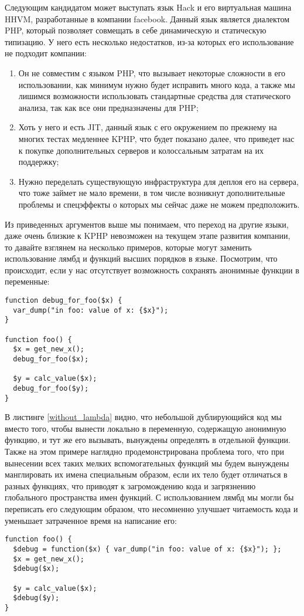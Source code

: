 Следующим кандидатом может выступать язык Hack и его виртуальная машина HHVM, разработанные в компании facebook.
Данный язык является диалектом PHP, который позволяет совмещать в себе динамическую и статическую типизацию.
У него есть несколько недостатков, из-за которых его использование не подходит компании:

\begin{enumerate}
\item Он не совместим с языком PHP, что вызывает некоторые сложности в его использовании, как минимум нужно будет исправить много кода, а также мы лишимся возможности использовать стандартные средства для статического анализа, так как все они предназначены для PHP;

\item Хоть у него и есть JIT, данный язык с его окружением по прежнему на многих тестах медленнее KPHP, что будет показано далее, что приведет нас к покупке дополнительных серверов и колоссальным затратам на их поддержку;

\item Нужно переделать существующую инфраструктура для деплоя его на сервера, что тоже займет не мало времени, в том числе возникнут дополнительные проблемы и спецэффекты о которых мы сейчас даже не можем предположить.
\end{enumerate}

Из приведенных аргументов выше мы понимаем, что переход на другие языки, даже очень близкие к KPHP невозможен на текущем этапе развития компании, то давайте взглянем на несколько примеров, которые могут заменить использование лямбд и функций высших порядков в языке.
Посмотрим, что происходит, если у нас отсутствует возможность сохранять анонимные функции в переменные:
\begin{lstlisting}[caption={Пример кода без анонимных функций},label={without_lambda}]
function debug_for_foo($x) {
  var_dump("in foo: value of x: {$x}");
}

function foo() {
  $x = get_new_x();
  debug_for_foo($x);

  $y = calc_value($x);
  debug_for_foo($y);
}
\end{lstlisting}

В листинге \ref{without_lambda} видно, что небольшой дублирующийся код мы вместо того, чтобы вынести локально в переменную, содержащую анонимную функцию, и тут же его вызывать, вынуждены определять в отдельной функции.
Также на этом примере наглядно продемонстрирована проблема того, что при вынесении всех таких мелких вспомогательных функций мы будем вынуждены манглировать их имена специальным образом, если их тело будет отличаться в разных функциях, что приводят к загромождению кода и загрязнению глобального пространства имен функций.
С использованием лямбд мы могли бы переписать его следующим образом, что несомненно улучшает читаемость кода и уменьшает затраченное время на написание его:
\begin{lstlisting}
function foo() {
  $debug = function($x) { var_dump("in foo: value of x: {$x}"); };
  $x = get_new_x();
  $debug($x);

  $y = calc_value($x);
  $debug($y);
}
\end{lstlisting}

